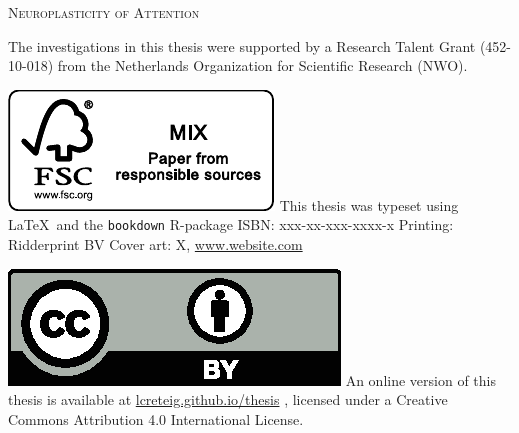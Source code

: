
{\pagestyle{empty} 

\def\drop{.1\textheight}
\vspace*{\drop}
\begin{center}
\Huge \textsc{Neuroplasticity of Attention} %
\end{center}

\clearpage
\vspace*{\fill}
\begingroup %
\small
\setlength{\parskip}{\baselineskip} %
\setlength\parindent{0pt} %
The investigations in this thesis were supported by 
a Research Talent Grant (452-10-018)  %
from 
the Netherlands Organization for Scientific Research (NWO). %

\includegraphics{_bookdown_files/FSC.pdf} \newline
This thesis was typeset using \LaTeX\ and the \verb+bookdown+ R-package \newline
ISBN: xxx-xx-xxx-xxxx-x \newline %
Printing: Ridderprint BV \newline %
Cover art: X, \url{www.website.com} %

\includegraphics{_bookdown_files/CC-BY.eps} \newline
An online version of this thesis is available at 
\url{lcreteig.github.io/thesis} %
, licensed under a 
Creative Commons Attribution 4.0 International License. %
\endgroup

}
